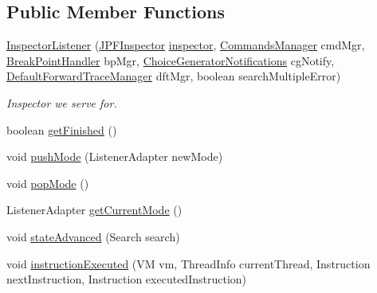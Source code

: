 \subsection*{Public Member Functions}
\begin{DoxyCompactItemize}
\item 
\hyperlink{classgov_1_1nasa_1_1jpf_1_1inspector_1_1server_1_1jpf_1_1_inspector_listener_a771ce923f7b4d0c347445fd81e242c96}{Inspector\+Listener} (\hyperlink{classgov_1_1nasa_1_1jpf_1_1inspector_1_1server_1_1jpf_1_1_j_p_f_inspector}{J\+P\+F\+Inspector} \hyperlink{classgov_1_1nasa_1_1jpf_1_1inspector_1_1server_1_1jpf_1_1_inspector_listener_aa9eefde45ad4c9704c87520e1dc2c29b}{inspector}, \hyperlink{classgov_1_1nasa_1_1jpf_1_1inspector_1_1server_1_1breakpoints_1_1_commands_manager}{Commands\+Manager} cmd\+Mgr, \hyperlink{classgov_1_1nasa_1_1jpf_1_1inspector_1_1server_1_1breakpoints_1_1_break_point_handler}{Break\+Point\+Handler} bp\+Mgr, \hyperlink{interfacegov_1_1nasa_1_1jpf_1_1inspector_1_1server_1_1choicegenerators_1_1_choice_generator_notifications}{Choice\+Generator\+Notifications} cg\+Notify, \hyperlink{classgov_1_1nasa_1_1jpf_1_1inspector_1_1server_1_1breakpoints_1_1_default_forward_trace_manager}{Default\+Forward\+Trace\+Manager} dft\+Mgr, boolean search\+Multiple\+Error)
\begin{DoxyCompactList}\small\item\em Inspector we serve for. \end{DoxyCompactList}\item 
boolean \hyperlink{classgov_1_1nasa_1_1jpf_1_1inspector_1_1server_1_1jpf_1_1_inspector_listener_aef0052bdfd398cded10e35161cffa6c3}{get\+Finished} ()
\item 
void \hyperlink{classgov_1_1nasa_1_1jpf_1_1inspector_1_1server_1_1jpf_1_1_inspector_listener_a21f414a408a95deadcada13c497967b5}{push\+Mode} (Listener\+Adapter new\+Mode)
\item 
void \hyperlink{classgov_1_1nasa_1_1jpf_1_1inspector_1_1server_1_1jpf_1_1_inspector_listener_adda9f59762013e4b291ee3c48e143ec3}{pop\+Mode} ()
\item 
Listener\+Adapter \hyperlink{classgov_1_1nasa_1_1jpf_1_1inspector_1_1server_1_1jpf_1_1_inspector_listener_a91e43a17398e973b7ff574cbf4b7c529}{get\+Current\+Mode} ()
\item 
void \hyperlink{classgov_1_1nasa_1_1jpf_1_1inspector_1_1server_1_1jpf_1_1_inspector_listener_a312b7050c023a2c4d769a2d3f5c9007e}{state\+Advanced} (Search search)
\item 
void \hyperlink{classgov_1_1nasa_1_1jpf_1_1inspector_1_1server_1_1jpf_1_1_inspector_listener_ac6c589659322755f9c5c2da4faebed80}{instruction\+Executed} (VM vm, Thread\+Info current\+Thread, Instruction next\+Instruction, Instruction executed\+Instruction)

\end{DoxyCompactItemize}
